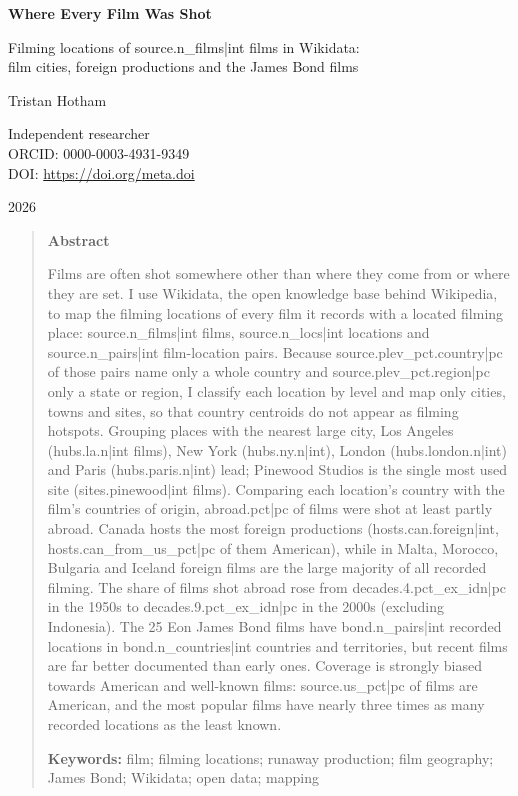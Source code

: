 \documentclass[11pt,a4paper]{article}
\begin{document}
\begin{center}
{\Large\bfseries Where Every Film Was Shot\par}
\vspace{0.4em}
{\large Filming locations of {{source.n_films|int}} films in Wikidata:\\film cities, foreign productions and the James Bond films\par}
\vspace{1.2em}
{\large Tristan Hotham\par}
\vspace{0.3em}
{\small Independent researcher\\
ORCID: 0000-0003-4931-9349\\
DOI: \href{https://doi.org/{{meta.doi}}}{https://doi.org/{{meta.doi}}}\par}
\vspace{0.8em}
2026
\end{center}

\begin{quote}
\small
\begin{center}\textbf{Abstract}\end{center}
Films are often shot somewhere other than where they come from or where they are set. I use Wikidata, the open knowledge base behind Wikipedia, to map the filming locations of every film it records with a located filming place: {{source.n_films|int}} films, {{source.n_locs|int}} locations and {{source.n_pairs|int}} film-location pairs. Because {{source.plev_pct.country|pc}} of those pairs name only a whole country and {{source.plev_pct.region|pc}} only a state or region, I classify each location by level and map only cities, towns and sites, so that country centroids do not appear as filming hotspots. Grouping places with the nearest large city, Los Angeles ({{hubs.la.n|int}} films), New York ({{hubs.ny.n|int}}), London ({{hubs.london.n|int}}) and Paris ({{hubs.paris.n|int}}) lead; Pinewood Studios is the single most used site ({{sites.pinewood|int}} films). Comparing each location's country with the film's countries of origin, {{abroad.pct|pc}} of films were shot at least partly abroad. Canada hosts the most foreign productions ({{hosts.can.foreign|int}}, {{hosts.can_from_us_pct|pc}} of them American), while in Malta, Morocco, Bulgaria and Iceland foreign films are the large majority of all recorded filming. The share of films shot abroad rose from {{decades.4.pct_ex_idn|pc}} in the 1950s to {{decades.9.pct_ex_idn|pc}} in the 2000s (excluding Indonesia). The 25 Eon James Bond films have {{bond.n_pairs|int}} recorded locations in {{bond.n_countries|int}} countries and territories, but recent films are far better documented than early ones. Coverage is strongly biased towards American and well-known films: {{source.us_pct|pc}} of films are American, and the most popular films have nearly three times as many recorded locations as the least known.

\textbf{Keywords:} film; filming locations; runaway production; film geography; James Bond; Wikidata; open data; mapping
\end{quote}
\end{document}
